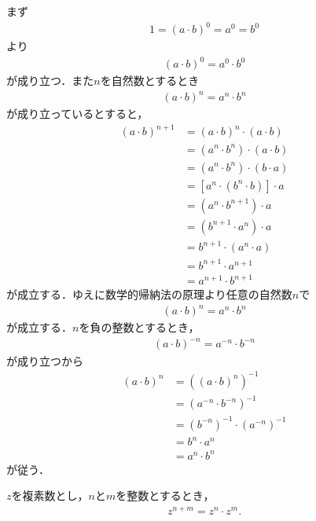 	\begin{sketch}
		まず
		\begin{align}
			1 = (a \cdot b)^0 = a^0 = b^0
		\end{align}
		より
		\begin{align}
			(a \cdot b)^0 = a^0 \cdot b^0
		\end{align}
		が成り立つ．また$n$を自然数とするとき
		\begin{align}
			(a \cdot b)^n = a^n \cdot b^n
		\end{align}
		が成り立っているとすると，
		\begin{align}
			(a \cdot b)^{n+1}
			&= (a \cdot b)^n \cdot (a \cdot b) \\
			&= (a^n \cdot b^n) \cdot (a \cdot b) \\
			&= (a^n \cdot b^n) \cdot (b \cdot a) \\
			&= \left[a^n \cdot (b^n \cdot b)\right] \cdot a \\
			&= (a^n \cdot b^{n+1}) \cdot a \\
			&= (b^{n+1} \cdot a^n) \cdot a \\
			&= b^{n+1} \cdot (a^n \cdot a) \\
			&= b^{n+1} \cdot a^{n+1} \\
			&= a^{n+1} \cdot b^{n+1}
		\end{align}
		が成立する．ゆえに数学的帰納法の原理より任意の自然数$n$で
		\begin{align}
			(a \cdot b)^n = a^n \cdot b^n
		\end{align}
		が成立する．$n$を負の整数とするとき，
		\begin{align}
			(a \cdot b)^{-n} = a^{-n} \cdot b^{-n}
		\end{align}
		が成り立つから
		\begin{align}
			(a \cdot b)^n &= ((a \cdot b)^n)^{-1} \\
			&= (a^{-n} \cdot b^{-n})^{-1} \\
			&= (b^{-n})^{-1} \cdot (a^{-n})^{-1} \\
			&= b^n \cdot a^n \\
			&= a^n \cdot b^n
		\end{align}
		が従う．
		\QED
	\end{sketch}
	
	\begin{screen}
		\begin{thm}[指数法則]\label{thm:exponential_law_of_complex_numbers}
			$z$を複素数とし，$n$と$m$を整数とするとき，
			\begin{align}
				z^{n+m} = z^n \cdot z^m.
			\end{align}
		\end{thm}
	\end{screen}
	
